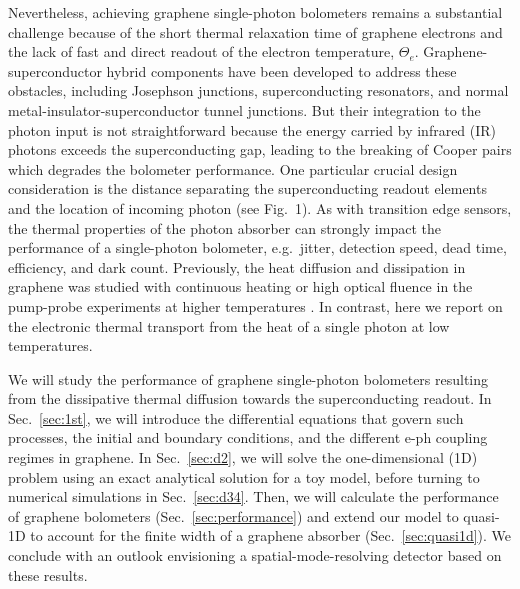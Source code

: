 \documentclass[aip, amsmath,amssymb, reprint]{revtex4-1}
\begin{document}
Nevertheless, achieving graphene single-photon bolometers remains a substantial challenge\cite{Du.2014} because of the short thermal relaxation time of graphene electrons\cite{Efetov.2018} and the lack of fast and direct readout of the electron temperature\cite{Han.2013,Fatimy.2016,Zoghi.2019}, $\Theta_e$. Graphene-superconductor hybrid components have been developed to address these obstacles, including Josephson junctions\cite{Walsh.2017,Lee.2020,Walsh.2021}, superconducting resonators\cite{Kokkoniemi.2020,Katti.2022}, and normal metal-insulator-superconductor tunnel junctions\cite{Vora.20128z}. But their integration to the photon input is not straightforward because the energy carried by infrared (IR) photons exceeds the superconducting gap, leading to the breaking of Cooper pairs which degrades the bolometer performance. One particular crucial design consideration is the distance separating the superconducting readout elements and the location of incoming photon (see Fig.\ 1). As with transition edge sensors, the thermal properties of the photon absorber can strongly impact the performance of a single-photon bolometer, e.g.\ jitter, detection speed, dead time, efficiency, and dark count. Previously, the heat diffusion and dissipation in graphene was studied with continuous heating or high optical fluence in the pump-probe experiments at higher temperatures \cite{Ruzicka.2010,Song.201102t,Brida.2013,Jago.2019,Draelos.2019o4h,Block.2021}. In contrast, here we report on the electronic thermal transport from the heat of a single photon at low temperatures.%

We will study the performance of graphene single-photon bolometers resulting from the dissipative thermal diffusion towards the superconducting readout. In Sec.\ \ref{sec:1st}, we will introduce the differential equations that govern such processes, the initial and boundary conditions, and the different e-ph coupling regimes in graphene. In Sec.\ \ref{sec:d2}, we will solve the one-dimensional (1D) problem using an exact analytical solution for a toy model, before turning to numerical simulations in Sec.\ \ref{sec:d34}. Then, we will calculate the performance of graphene bolometers (Sec.\ \ref{sec:performance}) and extend our model to quasi-1D to account for the finite width of a graphene absorber (Sec.\ \ref{sec:quasi1d}). We conclude with an outlook envisioning a spatial-mode-resolving detector based on these results. 
\end{document}
